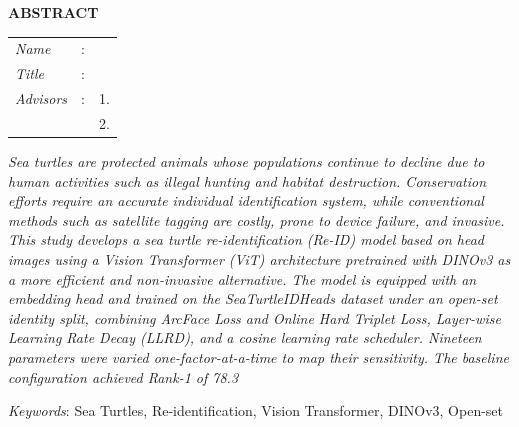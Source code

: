 \begin{center}
  \large\textbf{ABSTRACT}
\end{center}


\vspace{2ex}

\begingroup
\setlength{\tabcolsep}{0pt}

\noindent
\begin{tabularx}{\textwidth}{l >{\centering}m{3em} X}
  \emph{Name}     & : & \name{}         \\

  \emph{Title}    & : & \engtatitle{}   \\

  \emph{Advisors} & : & 1. \advisor{}   \\
                  &   & 2. \coadvisor{} \\
\end{tabularx}
\endgroup

\emph{
  Sea turtles are protected animals whose populations continue to decline due to human activities such as illegal hunting and habitat destruction. Conservation efforts require an accurate individual identification system, while conventional methods such as satellite tagging are costly, prone to device failure, and invasive. This study develops a sea turtle re-identification (Re-ID) model based on head images using a Vision Transformer (ViT) architecture pretrained with DINOv3 as a more efficient and non-invasive alternative. The model is equipped with an embedding head and trained on the SeaTurtleIDHeads dataset under an open-set identity split, combining ArcFace Loss and Online Hard Triplet Loss, Layer-wise Learning Rate Decay (LLRD), and a cosine learning rate scheduler. Nineteen parameters were varied one-factor-at-a-time to map their sensitivity. The baseline configuration achieved Rank-1 of 78.3%
}

\emph{Keywords}: Sea Turtles, Re-identification, Vision Transformer, DINOv3, Open-set
